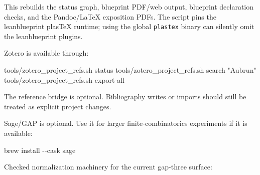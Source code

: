 \documentclass[
]{article}
\newenvironment{Shaded}{}{}
\newcommand{\NormalTok}[1]{#1}
\begin{document}
This rebuilds the status graph, blueprint PDF/web output, blueprint
declaration checks, and the Pandoc/LaTeX exposition PDFs. The script
pins the leanblueprint plasTeX runtime; using the global
\texttt{plastex} binary can silently omit the leanblueprint plugins.

Zotero is available through:

\begin{Shaded}
\begin{Highlighting}[]
\NormalTok{tools/zotero\_project\_refs.sh status}
\NormalTok{tools/zotero\_project\_refs.sh search "Aubrun"}
\NormalTok{tools/zotero\_project\_refs.sh export{-}all}
\end{Highlighting}
\end{Shaded}

The reference bridge is optional. Bibliography writes or imports should
still be treated as explicit project changes.

Sage/GAP is optional. Use it for larger finite-combinatorics experiments
if it is available:

\begin{Shaded}
\begin{Highlighting}[]
\NormalTok{brew install {-}{-}cask sage}
\end{Highlighting}
\end{Shaded}

Checked normalization machinery for the current gap-three surface:
\end{document}
